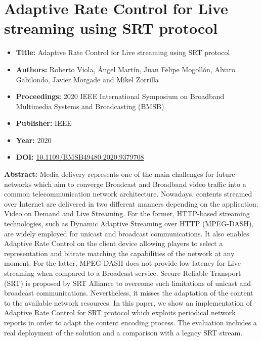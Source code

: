 

\section[Adaptive Rate Control for Live streaming using SRT protocol]{Adaptive Rate Control for Live streaming using SRT protocol}
\label{chap:BMSB2020}
\begin{itemize} \itemsep1pt\parskip0pt
	\item \textbf{Title:} Adaptive Rate Control for Live streaming using SRT protocol
	\item \textbf{Authors:} Roberto Viola, \'Angel Mart\'in, Juan Felipe Mogoll\'on, Alvaro Gabilondo, Javier Morgade and Mikel Zorrilla
	\item \textbf{Proceedings:} 2020 IEEE International Symposium on Broadband Multimedia Systems and Broadcasting (BMSB)
	\item \textbf{Publisher:} IEEE
	\item \textbf{Year:} 2020
	\item \textbf{DOI:}  \url{10.1109/BMSB49480.2020.9379708}
\end{itemize}

\textbf{Abstract:} Media delivery represents one of the main challenges for future networks which aim to converge Broadcast and Broadband video traffic into a common telecommunication network architecture. Nowadays, contents streamed over Internet are delivered in two different manners depending on the application: Video on Demand and Live Streaming. For the former, HTTP-based streaming technologies, such as Dynamic Adaptive Streaming over HTTP (MPEG-DASH), are widely employed for unicast and broadcast communications. It also enables Adaptive Rate Control on the client device allowing players to select a representation and bitrate matching the capabilities of the network at any moment. For the latter, MPEG-DASH does not provide low latency for Live streaming when compared to a Broadcast service. Secure Reliable Transport (SRT) is proposed by SRT Alliance to overcome such limitations of unicast and broadcast communications. Nevertheless, it misses the adaptation of the content to the available network resources. In this paper, we show an implementation of Adaptive Rate Control for SRT protocol which exploits periodical network reports in order to adapt the content encoding process. The evaluation includes a real deployment of the solution and a comparison with a legacy SRT stream.

